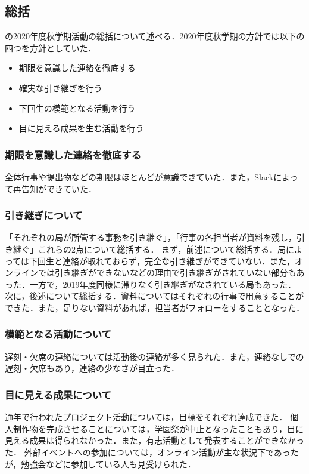 \subsection*{\secondGrade{}総括}


\secondGrade{}の2020年度秋学期活動の総括について述べる．2020年度秋学期の方針では以下の四つを方針としていた．
\begin{itemize}
    \item 期限を意識した連絡を徹底する
    \item 確実な引き継ぎを行う
    \item 下回生の模範となる活動を行う
    \item 目に見える成果を生む活動を行う
\end{itemize}

\subsubsection*{期限を意識した連絡を徹底する}
全体行事や提出物などの期限はほとんどが意識できていた．また，Slackによって再告知ができていた．

\subsubsection*{引き継ぎについて}
「それぞれの局が所管する事務を引き継ぐ」，「行事の各担当者が資料を残し，引き継ぐ」これらの2点について総括する．
まず，前述について総括する．局によっては下回生と連絡が取れておらず，完全な引き継ぎができていない．また，オンラインでは引き継ぎができないなどの理由で引き継ぎがされていない部分もあった．一方で，2019年度同様に滞りなく引き継ぎがなされている局もあった．
次に，後述について総括する．資料についてはそれぞれの行事で用意することができた．また，足りない資料があれば，担当者がフォローをすることとなった．

\subsubsection*{模範となる活動について}
遅刻・欠席の連絡については活動後の連絡が多く見られた．また，連絡なしでの遅刻・欠席もあり，連絡の少なさが目立った．

\subsubsection*{目に見える成果について}
通年で行われたプロジェクト活動については，目標をそれぞれ達成できた．
個人制作物を完成させることについては，学園祭が中止となったこともあり，目に見える成果は得られなかった．また，有志活動として発表することができなかった．
外部イベントへの参加については，オンライン活動が主な状況下であったが，勉強会などに参加している人も見受けられた．
